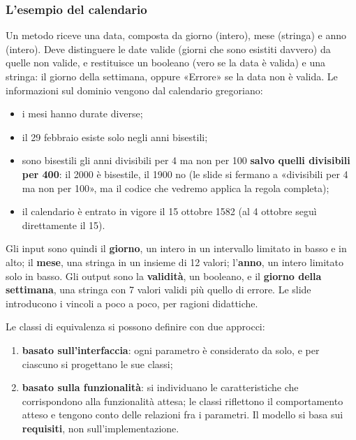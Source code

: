 \subsubsection*{L'esempio del calendario}

Un metodo riceve una data, composta da giorno (intero), mese (stringa) e anno (intero). Deve distinguere le date
valide (giorni che sono esistiti davvero) da quelle non valide, e restituisce un booleano (vero se la data è valida) e
una stringa: il giorno della settimana, oppure «Errore» se la data non è valida. Le informazioni sul dominio vengono dal
calendario gregoriano:

\begin{itemize}
  \item i mesi hanno durate diverse;
  \item il 29 febbraio esiste solo negli anni bisestili;
  \item sono bisestili gli anni divisibili per 4 ma non per 100 \textbf{salvo quelli divisibili per 400}: il 2000 è
        bisestile, il 1900 no (le slide si fermano a «divisibili per 4 ma non per 100», ma il codice che vedremo
        applica la regola completa);
  \item il calendario è entrato in vigore il 15 ottobre 1582 (al 4 ottobre seguì direttamente il 15).
\end{itemize}

Gli input sono quindi il \textbf{giorno}, un intero in un intervallo limitato in basso e in alto; il \textbf{mese}, una
stringa in un insieme di 12 valori; l'\textbf{anno}, un intero limitato solo in basso. Gli output sono la
\textbf{validità}, un booleano, e il \textbf{giorno della settimana}, una stringa con 7 valori validi più quello di
errore. Le slide introducono i vincoli a poco a poco, per ragioni didattiche.

Le classi di equivalenza si possono definire con due approcci:

\begin{enumerate}
  \item \textbf{basato sull'interfaccia}: ogni parametro è considerato da solo, e per ciascuno si progettano le sue
        classi;
  \item \textbf{basato sulla funzionalità}: si individuano le caratteristiche che corrispondono alla funzionalità
        attesa; le classi riflettono il comportamento atteso e tengono conto delle relazioni fra i parametri. Il
        modello si basa sui \textbf{requisiti}, non sull'implementazione.
\end{enumerate}

